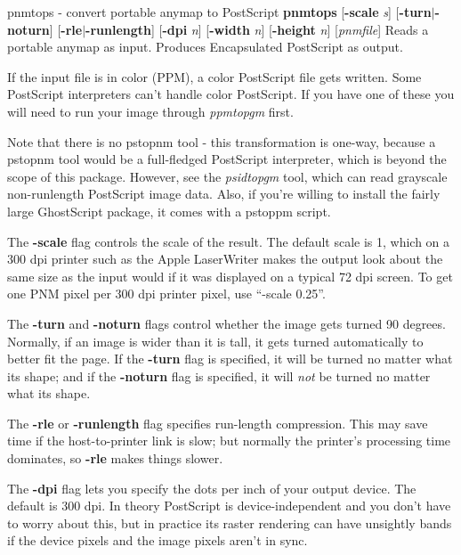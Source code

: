 pnmtops - convert portable anymap to PostScript
{\bf pnmtops}
{\rm [}{\bf -scale}
{\it s}{\rm ]}
{\rm [}{\bf -turn}{\rm $|$}{\bf -noturn}{\rm ]}
{\rm [}{\bf -rle}{\rm $|$}{\bf -runlength}{\rm ]}
{\rm [}{\bf -dpi}
{\it n}{\rm ]}
{\rm [}{\bf -width}
{\it n}{\rm ]}
{\rm [}{\bf -height}
{\it n}{\rm ]}
{\rm [}{\it pnmfile}{\rm ]}
Reads a portable anymap as input.
Produces Encapsulated PostScript as output.
\par
If the input file is in color (PPM), a color PostScript file gets
written.
Some PostScript interpreters can't handle color PostScript.
If you have one of these you will need to run your image through
{\it ppmtopgm}
first.
\par
Note that there is no pstopnm
tool - this transformation is one-way, because a pstopnm tool would
be a full-fledged PostScript interpreter, which is beyond the scope
of this package.
However, see the
{\it psidtopgm}
tool, which can read grayscale non-runlength PostScript image data.
Also, if you're willing to install the fairly large GhostScript package,
it comes with a pstoppm script.
\par
The
{\bf -scale}
flag controls the scale of the result.  The default scale is 1,
which on a 300 dpi printer such as the Apple LaserWriter makes
the output look about the same size as the input would if it was displayed
on a typical 72 dpi screen.
To get one PNM pixel per 300 dpi printer pixel, use ``-scale 0.25''.
\par
The
{\bf -turn}
and
{\bf -noturn}
flags control whether the image gets turned 90 degrees.
Normally, if an image is wider than it is tall, it gets turned
automatically to better fit the page.
If the
{\bf -turn}
flag is specified, it will be turned no matter what its shape; and if the
{\bf -noturn}
flag is specified, it will
{\it not}
be turned no matter what its shape.
\par
The
{\bf -rle}
or
{\bf -runlength}
flag specifies run-length compression.  This may save
time if the host-to-printer link is slow; but normally the printer's processing
time dominates, so
{\bf -rle}
makes things slower.
\par
The
{\bf -dpi}
flag lets you specify the dots per inch of your output device.
The default is 300 dpi.
In theory PostScript is device-independent and you don't have to
worry about this, but in practice its raster rendering can have
unsightly bands if the device pixels and the image pixels aren't
in sync.
\par
